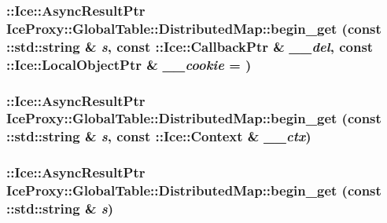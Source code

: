 \label{class_ice_proxy_1_1_global_table_1_1_distributed_map_a3f6b6e7aea12069b148799d36ef93e3a}
\hypertarget{class_ice_proxy_1_1_global_table_1_1_distributed_map_ab430604b326a6a62a26b099580888a9d}{
\subsubsection[{begin\_\-get}]{\setlength{\rightskip}{0pt plus 5cm}::Ice::AsyncResultPtr IceProxy::GlobalTable::DistributedMap::begin\_\-get (const ::std::string \& {\em s}, \/  const ::Ice::CallbackPtr \& {\em \_\-\_\-del}, \/  const ::Ice::LocalObjectPtr \& {\em \_\-\_\-cookie} = {})}}
\label{class_ice_proxy_1_1_global_table_1_1_distributed_map_ab430604b326a6a62a26b099580888a9d}
\hypertarget{class_ice_proxy_1_1_global_table_1_1_distributed_map_accd5528317383e4165bbf3c27a65d074}{
\subsubsection[{begin\_\-get}]{\setlength{\rightskip}{0pt plus 5cm}::Ice::AsyncResultPtr IceProxy::GlobalTable::DistributedMap::begin\_\-get (const ::std::string \& {\em s}, \/  const ::Ice::Context \& {\em \_\-\_\-ctx})}}
\label{class_ice_proxy_1_1_global_table_1_1_distributed_map_accd5528317383e4165bbf3c27a65d074}
\hypertarget{class_ice_proxy_1_1_global_table_1_1_distributed_map_a806ad7b6fa26ee40c6f4f41f64994946}{
\subsubsection[{begin\_\-get}]{\setlength{\rightskip}{0pt plus 5cm}::Ice::AsyncResultPtr IceProxy::GlobalTable::DistributedMap::begin\_\-get (const ::std::string \& {\em s})}}
